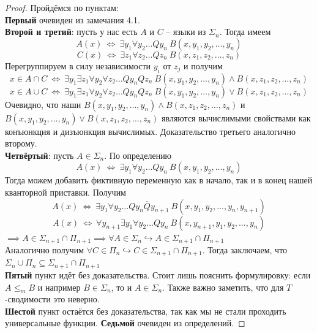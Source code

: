 \documentclass[11pt]{article}
\begin{document}
\begin{proof}
  Пройдёмся по пунктам: \\
  \textbf{Первый} очевиден из замечания 4.1. \\
  \textbf{Второй и третий}: пусть у нас есть $A$ и $C$ -- языки из 
  $\Sigma_n$. Тогда имеем
  \[A(x) \ \Longleftrightarrow \ \exists y_1 \forall y_2 \ldots Q y_n \
  B(x, y_1, y_2, \ldots, y_n)\]
  \[C(x) \ \Longleftrightarrow \ \exists z_1 \forall z_2 \ldots Q z_n \
  B(x, z_1, z_2, \ldots, z_n)\]
  Перегруппируем в силу независимости $y_i$ от $z_j$ и получим
  \[x \in A \cap C \ \Longleftrightarrow \ \exists y_1 \exists z_1 
  \forall y_2 \forall z_2 \ldots Q y_n Q z_n \ B(x, y_1, y_2, \ldots, 
  y_n) \wedge B(x, z_1, z_2, \ldots, z_n)\]
  \[x \in A \cup C \ \Longleftrightarrow \ \exists y_1 \exists z_1 
  \forall y_2 \forall z_2 \ldots Q y_n Q z_n \ B(x, y_1, y_2, \ldots, 
  y_n) \vee B(x, z_1, z_2, \ldots, z_n)\]
  Очевидно, что наши $B(x, y_1, y_2, \ldots, y_n) \wedge B(x, z_1, z_2, 
  \ldots, z_n)$ и $B(x, y_1, y_2, \ldots, y_n) \vee B(x, z_1, z_2, 
  \ldots, z_n)$ являются вычислимыми свойствами как конъюнкция и 
  дизъюнкция вычислимых. Доказательство третьего аналогично второму. \\
  \textbf{Четвёртый}: пусть $A \in \Sigma_n$. По определению
  \[A(x) \ \Longleftrightarrow \ \exists y_1 \forall y_2 \ldots Q y_n \
  B(x, y_1, y_2, \ldots, y_n)\]
  Тогда можем добавить фиктивную переменную как в начало, так и в конец 
  нашей кванторной приставки. Получим 
  \[A(x) \ \Longleftrightarrow \ \exists y_1 \forall y_2 \ldots Q y_n 
  \overline{Q} y_{n + 1} \ B(x, y_1, y_2, \ldots, y_n, y_{n + 1})\]
  \[A(x) \ \Longleftrightarrow \ \forall y_{n + 1} \exists y_1 \forall 
  y_2 \ldots Q y_n \ B(x, y_{n + 1}, y_1, y_2, \ldots, y_n)\]
  $\implies A \in \Sigma_{n + 1} \cap \Pi_{n + 1} \implies \forall A \in 
  \Sigma_n \hookrightarrow A \in \Sigma_{n + 1} \cap \Pi_{n + 1}$ \\
  Аналогично получим $\forall C \in \Pi_n \hookrightarrow C \in \Sigma_{n + 1} 
  \cap \Pi_{n + 1}$. Тогда заключаем, что $\Sigma_n \cup \Pi_n \subseteq 
  \Sigma_{n + 1} \cap \Pi_{n + 1}$ \\
  \textbf{Пятый} пункт идёт без доказательства. Стоит лишь пояснить 
  формулировку: если $A \leq_m B$ и например $B \in \Sigma_n$, то и 
  $A \in \Sigma_n$. Также важно заметить, что для $T$-сводимости это 
  неверно. \\
  \textbf{Шестой} пункт остаётся без доказательства, так как мы не стали 
  проходить универсальные функции.
  \textbf{Седьмой} очевиден из определений.
\end{proof}
\end{document}
